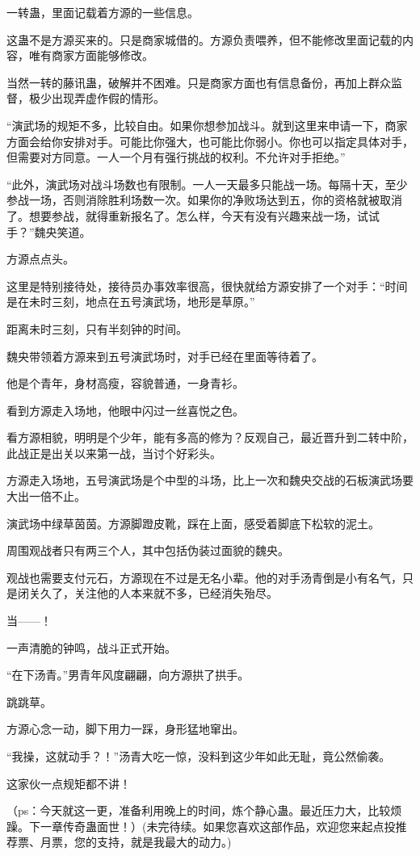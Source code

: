 \begin{this_body}
一转蛊，里面记载着方源的一些信息。

这蛊不是方源买来的。只是商家城借的。方源负责喂养，但不能修改里面记载的内容，唯有商家方面能够修改。

当然一转的藤讯蛊，破解并不困难。只是商家方面也有信息备份，再加上群众监督，极少出现弄虚作假的情形。

“演武场的规矩不多，比较自由。如果你想参加战斗。就到这里来申请一下，商家方面会给你安排对手。可能比你强大，也可能比你弱小。你也可以指定具体对手，但需要对方同意。一人一个月有强行挑战的权利。不允许对手拒绝。”

“此外，演武场对战斗场数也有限制。一人一天最多只能战一场。每隔十天，至少参战一场，否则消除胜利场数一次。如果你的净败场达到五，你的资格就被取消了。想要参战，就得重新报名了。怎么样，今天有没有兴趣来战一场，试试手？”魏央笑道。

方源点点头。

这里是特别接待处，接待员办事效率很高，很快就给方源安排了一个对手：“时间是在未时三刻，地点在五号演武场，地形是草原。”

距离未时三刻，只有半刻钟的时间。

魏央带领着方源来到五号演武场时，对手已经在里面等待着了。

他是个青年，身材高瘦，容貌普通，一身青衫。

看到方源走入场地，他眼中闪过一丝喜悦之色。

看方源相貌，明明是个少年，能有多高的修为？反观自己，最近晋升到二转中阶，此战正是出关以来第一战，当讨个好彩头。

方源走入场地，五号演武场是个中型的斗场，比上一次和魏央交战的石板演武场要大出一倍不止。

演武场中绿草茵茵。方源脚蹬皮靴，踩在上面，感受着脚底下松软的泥土。

周围观战者只有两三个人，其中包括伪装过面貌的魏央。

观战也需要支付元石，方源现在不过是无名小辈。他的对手汤青倒是小有名气，只是闭关久了，关注他的人本来就不多，已经消失殆尽。

当——！

一声清脆的钟鸣，战斗正式开始。

“在下汤青。”男青年风度翩翩，向方源拱了拱手。

跳跳草。

方源心念一动，脚下用力一踩，身形猛地窜出。

“我操，这就动手？！”汤青大吃一惊，没料到这少年如此无耻，竟公然偷袭。

这家伙一点规矩都不讲！

（ps：今天就这一更，准备利用晚上的时间，炼个静心蛊。最近压力大，比较烦躁。下一章传奇蛊面世！）(未完待续。如果您喜欢这部作品，欢迎您来起点投推荐票、月票，您的支持，就是我最大的动力。)

\end{this_body}

